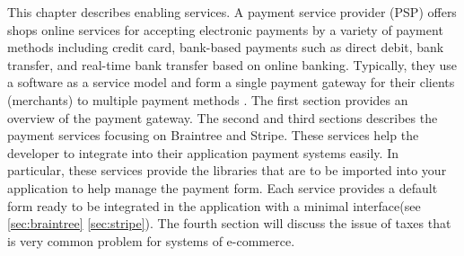 This chapter describes enabling services.
\newline
A payment service provider (PSP) offers shops online services for accepting electronic payments by a variety of payment methods including credit card, bank-based payments such as direct debit, bank transfer, and real-time bank transfer based on online banking. Typically, they use a software as a service model and form a single payment gateway for their clients (merchants) to multiple payment methods \cite{payment_service_provider}.
\newline
The first section provides an overview of the payment gateway. The second and third sections describes the payment services focusing on Braintree and Stripe.
\newline
These services help the developer to integrate into their application payment systems easily. In particular, these services provide the libraries that are to be imported into your application to help manage the payment form. Each service provides a default form ready to be integrated in the application with a minimal interface(see \ref{sec:braintree} \ref{sec:stripe}).
\newline
The fourth section will discuss the issue of taxes that is very common problem for systems of e-commerce.